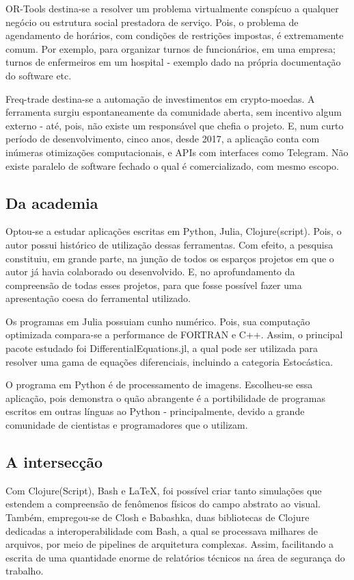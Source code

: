 \documentclass[
12pt,				%
openright,			%
oneside,			%
a4paper,			%
english,			%
french,				%
spanish,			%
brazil,				%
]{abntex2}
\begin{document}
OR-Tools destina-se a resolver um problema virtualmente
conspícuo a qualquer negócio ou estrutura social prestadora de
serviço. Pois, o problema de agendamento de horários, com condições de
restrições impostas, é extremamente comum. Por exemplo, para organizar
turnos de funcionários, em uma empresa; turnos de enfermeiros em um
hospital - exemplo dado na própria documentação do software etc.

Freq-trade destina-se a automação de investimentos em
crypto-moedas. A ferramenta surgiu espontaneamente da comunidade
aberta, sem incentivo algum externo - até, pois, não existe um
responsável que chefia o projeto. E, num curto período de
desenvolvimento, cinco anos, desde 2017, a aplicação conta com
inúmeras otimizações computacionais, e APIs com interfaces como
Telegram. Não existe paralelo de software fechado o qual é
comercializado, com mesmo escopo.

\subsection{Da academia}
\label{subsec:res-academia}

Optou-se a estudar aplicações escritas em Python, Julia,
Clojure(script). Pois, o autor possui histórico de
utilização dessas ferramentas. Com efeito, a pesquisa constituiu, em
grande parte, na junção de todos os esparços projetos em que o autor
já havia colaborado ou desenvolvido. E, no aprofundamento da
compreensão de todas esses projetos, para que fosse possível fazer uma
apresentação coesa do ferramental utilizado.

Os programas em Julia possuiam cunho numérico. Pois, sua computação
optimizada compara-se a performance de FORTRAN e C++. Assim, o
principal pacote estudado foi DifferentialEquations.jl, a qual pode
ser utilizada para resolver uma gama de equações diferenciais,
incluindo a categoria Estocástica.

O programa em Python é de processamento de imagens. Escolheu-se essa
aplicação, pois demonstra o quão abrangente é a portibilidade de
programas escritos em outras línguas ao Python - principalmente,
devido a grande comunidade de cientistas e programadores que o
utilizam.

\subsection{A intersecção}

Com Clojure(Script), Bash e \LaTeX{}, foi possível criar tanto
simulações que estendem a compreensão de fenômenos físicos do campo
abstrato ao visual. Também, empregou-se de Closh e Babashka, duas
bibliotecas de Clojure dedicadas a interoperabilidade com Bash, a qual
se processava milhares de arquivos, por meio de pipelines de
arquitetura complexas. Assim, facilitando a escrita de uma quantidade
enorme de relatórios técnicos na área de segurança do trabalho. 
\end{document}
